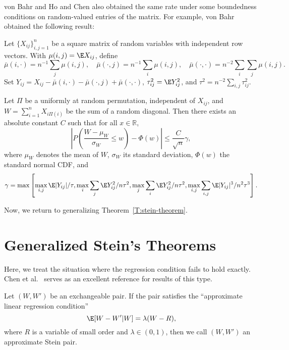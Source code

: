 von Bahr \cite{bahr1976remainder} and Ho and Chen \cite{ho1978l_p}
also obtained the same rate under some boundedness conditions
on random-valued entries of the matrix.  For example, von
Bahr obtained the following result:
\begin{theorem}
  Let $\{X_{ij}\}_{i, j = 1}^n$ be a square matrix of random variables with
  independent row vectors.
  With $\mu(i, j) = \E X_{ij}$, define
  \begin{equation*}
    \bar{\mu}(i, \cdot) = n^{-1} \sum_j \mu(i, j), \quad
    \bar{\mu}(\cdot, j) = n^{-1} \sum_i \mu(i, j), \quad
    \bar{\mu}(\cdot, \cdot) = n^{-2} \sum_i \sum_j \mu(i, j). \quad
  \end{equation*}
  Set $Y_{ij} = X_{ij} - \bar{\mu}(i, \cdot) - \bar{\mu}(\cdot, j) + \bar{\mu}(\cdot, \cdot)$,
  $\tau_{ij}^2 = \E Y_{ij}^2$, and $\tau^2 = n^{-2} \sum_{i, j} \tau_{ij}^2$.

  Let $\Pi$ be a uniformly at random permutation, independent of $X_{ij}$, and
  $W = \sum_{i=1}^n X_{i\Pi(i)}$ be the sum of a random diagonal.
  Then there exists an absolute constant $C$ such that for all $x \in \mathbb{R}$,
  \begin{equation*}
    \left |P \left (\frac{W - \mu_W}{\sigma_W} \leq w \right ) - \Phi(w) \right |
    \leq \frac{C}{\sqrt{n}} \gamma,
  \end{equation*}
  where $\mu_W$ denotes the mean of $W$, $\sigma_W$ its standard deviation,
  $\Phi(w)$ the standard normal CDF, and
  \begin{equation*}
    \gamma = \max \left [
      \max_{i, j} \E |Y_{ij}| / \tau,
      \max_i \sum_j \E Y_{ij}^2 / n \tau^2,
      \max_j \sum_i \E Y_{ij}^2 / n \tau^2,
      \max_{i, j} \sum_{i, j} \E |Y_{ij}|^3 / n^2 \tau^3
    \right ].
  \end{equation*}
\end{theorem}

Now, we return to generalizing Theorem~\ref{T:stein-theorem}.

\section{Generalized Stein's Theorems}
Here, we treat the situation where the regression condition fails to hold exactly.
Chen et al.\ \cite{chen2010normal} serves as an excellent reference for results
of this type.

\begin{definition}
  Let $(W, W')$ be an exchangeable pair.  If the pair satisfies the ``approximate linear
  regression condition''
  \begin{equation}
    \label{D:approx-stein-pair}
    \E [W - W' | W] = \lambda (W - R),
  \end{equation}
  where $R$ is a variable of small order and $\lambda \in (0, 1)$, then we call $(W, W')$ an
  approximate Stein pair.
\end{definition}

